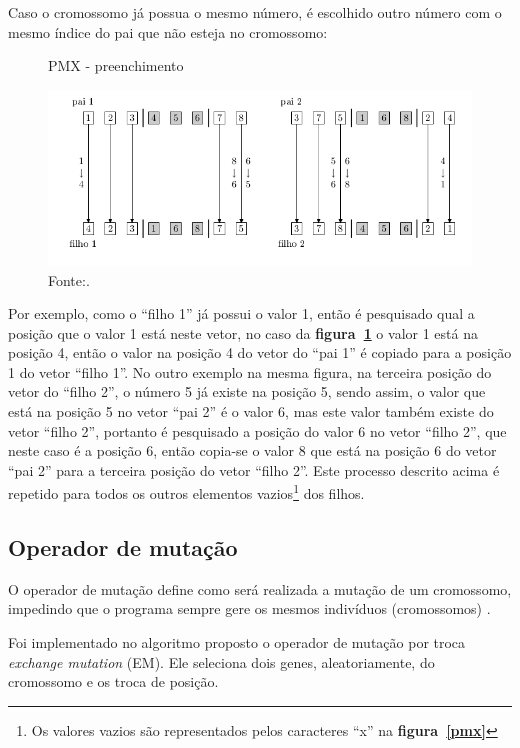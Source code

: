 \documentclass[12pt,openright,a4paper,twoside]{tcc}
\begin{document}
	   		Caso o cromossomo já possua o mesmo número, é escolhido outro número com o mesmo índice do pai que não esteja no cromossomo:
	   		\begin{figure}[h]
				\centering
                \caption{PMX - preenchimento}
		        \includegraphics[width = 14cm,keepaspectratio]{img/pmx2.png}		        
		        \caption*{Fonte:\cite{0012-pdf}.}
		        \label{pmx2}
	   		\end{figure}

	   		Por exemplo, como o ``filho 1'' já possui o valor 1, então é pesquisado qual a posição que o valor 1 está neste vetor, no caso da \textbf{figura~\ref{pmx2}} o valor 1 está na posição 4, então o valor na posição 4 do vetor do ``pai 1'' é copiado para a posição 1 do vetor ``filho 1''. No outro exemplo na mesma figura, na terceira posição do vetor do ``filho 2'',  o número 5 já existe na posição 5, sendo assim, o valor que está na posição 5 no vetor ``pai 2'' é o valor 6, mas este valor também existe do vetor ``filho 2'', portanto é pesquisado a posição do valor 6 no vetor ``filho 2'', que neste caso é a posição 6, então copia-se o valor 8 que está na posição 6 do vetor ``pai 2'' para a terceira posição do vetor ``filho 2''. 
	   		Este processo descrito acima é repetido para todos os outros elementos vazios\footnote{Os valores vazios são representados pelos caracteres ``x'' na \textbf{figura~\ref{pmx}}} dos filhos.
	   		  
		\subsection{Operador de mutação}
			\label{Sem}
			O operador de mutação define como será realizada a mutação de um cromossomo, impedindo que o programa sempre gere os mesmos indivíduos (cromossomos) \cite{0012-pdf}.

			Foi implementado no algoritmo proposto o operador de mutação por troca \textit{exchange mutation} (EM). Ele seleciona dois genes, aleatoriamente, do cromossomo e os troca de posição.
\end{document}
